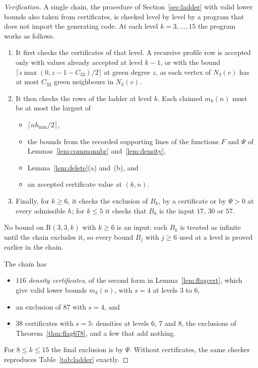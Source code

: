 \documentclass[11pt]{article}
\theoremstyle{spacedplain}
\theoremstyle{spaceddef}
\theoremstyle{spacedremark}
\newcommand{\R}{\mathrm{R}}
\begin{document}
\begin{proof}[Verification]
A single chain, the procedure of Section~\ref{sec:ladder} with valid lower bounds also taken from certificates, is checked level by level by a program that does not import the generating code.
At each level $k=3,\dots,15$ the program works as follows.
\begin{enumerate}
\item It first checks the certificates of that level.
A recursive profile row is accepted only with values already accepted at level $k-1$, or with the bound $\lceil z\max(0,z-1-C_{33})/2\rceil$ at green degree $z$, as each vertex of $N_3(v)$ has at most $C_{33}$ green neighbours in $N_3(v)$.
\item It then checks the rows of the ladder at level $k$.
Each claimed $m_k(n)$ must be at most the largest of
\begin{itemize}
\item $\lceil nh_{\min}/2\rceil$,
\item the bounds from the recorded supporting lines of the functions $F$ and $\Psi$ of Lemmas~\ref{lem:commonnbr} and~\ref{lem:density},
\item Lemma~\ref{lem:delete}(a) and~(b), and
\item an accepted certificate value at $(k,n)$.
\end{itemize}
\item Finally, for $k\ge 6$, it checks the exclusion of $B_k$, by a certificate or by $\Psi>0$ at every admissible $h$; for $k\le 5$ it checks that $B_k$ is the input $17$, $30$ or $57$.
\end{enumerate}
No bound on $\R(3,3,k)$ with $k\ge 6$ is an input: each $B_k$ is treated as infinite until the chain excludes it, so every bound $B_j$ with $j\ge 6$ used at a level is proved earlier in the chain.

The chain has
\begin{itemize}
\item $116$ \emph{density certificates}, of the second form in Lemma~\ref{lem:flagcert}, which give valid lower bounds $m_k(n)$, with $s=4$ at levels $3$ to $6$,
\item an exclusion of $87$ with $s=4$, and
\item $38$ certificates with $s=5$: densities at levels $6$, $7$ and $8$, the exclusions of Theorem~\ref{thm:flag678}, and a few that add nothing.
\end{itemize}
For $8\le k\le 15$ the final exclusion is by $\Psi$.
Without certificates, the same checker reproduces Table~\ref{tab:ladder} exactly.
\end{proof}
\end{document}
